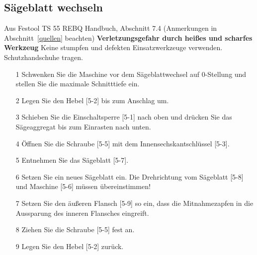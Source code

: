 \documentclass{\basedir/fablab-document}
\begin{document}
\subsection{Sägeblatt wechseln}
\begin{minipage}{70mm}
   \begin{leftbar}{Aus Festool TS 55 REBQ Handbuch, Abschnitt 7.4 (Anmerkungen in Abschnitt~\ref{quellen} beachten)}
\textbf{Verletzungsgefahr durch heißes und scharfes Werkzeug}
Keine stumpfen und defekten Einsatzwerkzeuge verwenden. Schutzhandschuhe tragen.

\begin{itemize}
\item[1] Schwenken Sie die Maschine vor dem Sägeblattwechsel auf 0\textdegree -Stellung und stellen Sie
die maximale Schnitttiefe ein.
\item[2] Legen Sie den Hebel [5-2] bis zum Anschlag um.
\item[3] Schieben Sie die Einschaltsperre [5-1] nach
oben und drücken Sie das Sägeaggregat bis
zum Einrasten nach unten.
\item[4] Öffnen Sie die Schraube [5-5] mit dem Innensechskantschlüssel [5-3].
\item[5] Entnehmen Sie das Sägeblatt [5-7].
\item[6] Setzen Sie ein neues Sägeblatt ein.
Die Drehrichtung vom Sägeblatt [5-8]
und Maschine [5-6] müssen übereinstimmen!
\item[7] Setzen Sie den äußeren Flansch [5-9] so
ein, dass die Mitnahmezapfen in die Aussparung des inneren Flansches eingreift.
\item[8] Ziehen Sie die Schraube [5-5] fest an.
\item[9] Legen Sie den Hebel [5-2] zurück.
\end{itemize}
\end{leftbar}
\end{minipage}
\hspace{7mm}
\end{document}

